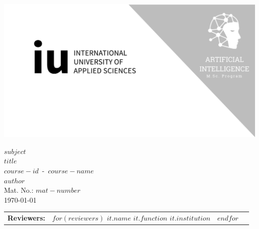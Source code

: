 \newenvironment{myblock}{\center}{\endcenter}
\thispagestyle{empty}

\centerline{\includegraphics[width=\paperwidth]{template/img/cover-image.png}}

\vspace{8.5em}

{\Large $subject$}\\
{\Huge $title$}\\
{\LARGE $course-id$\ -\ $course-name$}\\
{\LARGE $author$}\\
{\Large Mat. No.: $mat-number$}\\
{\Large \germandatetime\today}

\vspace*{\fill}

\begin{tabular}{p{0.8in} p{1.5in} p{1.5in} p{1.5in}}
    \textbf{Reviewers:} &
    $for(reviewers)$
        \begin{myblock}
        $it.name$ \break{}
        $it.function$ \break{}
        $it.institution$
        \end{myblock} &
    $endfor$

\end{tabular}


\restoregeometry{}
\clearpage
